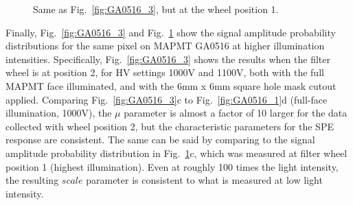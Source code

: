 \begin{figure}[hbt] 
\centering 
  \caption{Same as Fig.~\ref{fig:GA0516_3}, but at the wheel position 1. 
    }
\label{fig:GA0516_4}
\end{figure}


Finally, Fig.~\ref{fig:GA0516_3} and Fig.~\ref{fig:GA0516_4} show the signal amplitude probability distributions for the same pixel on MAPMT GA0516 at higher illumination intensities. 
Specifically, Fig.~\ref{fig:GA0516_3} shows the results when the filter wheel is at position 2, for HV settings 1000V and 1100V, both with the full MAPMT face illuminated, and with the 6mm x 6mm square hole mask cutout applied. 
Comparing Fig.~\ref{fig:GA0516_3}c to Fig.~\ref{fig:GA0516_1}d (full-face illumination, 1000V), the $\mu$ parameter is almost a factor of 10 larger for the data collected with wheel position 2, but the characteristic parameters for the SPE response are consistent. 
The same can be said by comparing to the signal amplitude probability distribution in Fig.~\ref{fig:GA0516_4}c, which was measured at filter wheel position 1 (highest illumination). 
Even at roughly 100 times the light intensity, the resulting $scale$ parameter is consistent to what is measured at low light intensity. 

